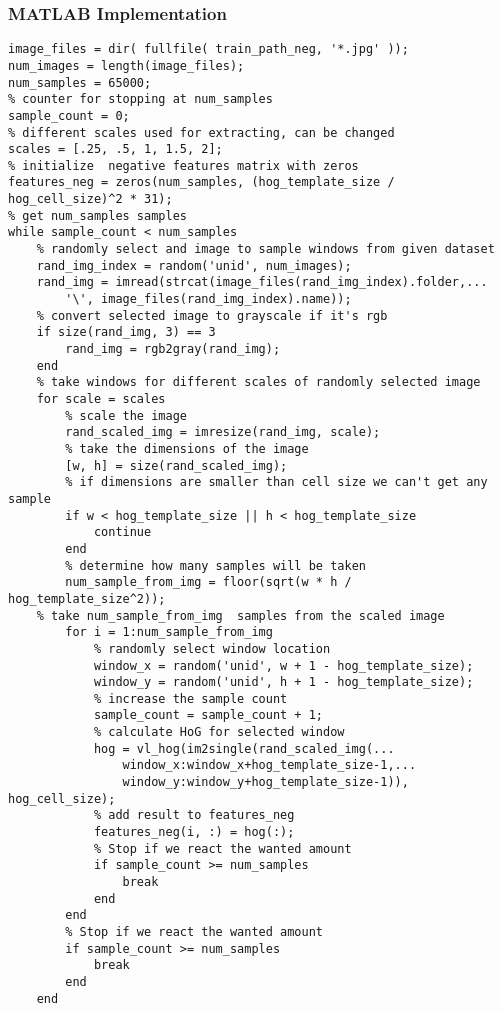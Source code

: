\documentclass{article}
\begin{document}
\subsubsection{MATLAB Implementation}
\begin{lstlisting}[caption={Related part of the get\_training\_features function for getting HoG values of non-face images.},captionpos=b]
image_files = dir( fullfile( train_path_neg, '*.jpg' ));
num_images = length(image_files);
num_samples = 65000;
% counter for stopping at num_samples
sample_count = 0;
% different scales used for extracting, can be changed
scales = [.25, .5, 1, 1.5, 2];
% initialize  negative features matrix with zeros
features_neg = zeros(num_samples, (hog_template_size / hog_cell_size)^2 * 31);
% get num_samples samples    
while sample_count < num_samples
    % randomly select and image to sample windows from given dataset
    rand_img_index = random('unid', num_images);
    rand_img = imread(strcat(image_files(rand_img_index).folder,...
        '\', image_files(rand_img_index).name));
    % convert selected image to grayscale if it's rgb
    if size(rand_img, 3) == 3
        rand_img = rgb2gray(rand_img);
    end
    % take windows for different scales of randomly selected image
    for scale = scales
        % scale the image
        rand_scaled_img = imresize(rand_img, scale);
        % take the dimensions of the image
        [w, h] = size(rand_scaled_img);    
        % if dimensions are smaller than cell size we can't get any sample 
        if w < hog_template_size || h < hog_template_size
            continue
        end
        % determine how many samples will be taken
        num_sample_from_img = floor(sqrt(w * h / hog_template_size^2));
	% take num_sample_from_img  samples from the scaled image
        for i = 1:num_sample_from_img
            % randomly select window location 
            window_x = random('unid', w + 1 - hog_template_size);
            window_y = random('unid', h + 1 - hog_template_size);
            % increase the sample count
            sample_count = sample_count + 1;
            % calculate HoG for selected window
            hog = vl_hog(im2single(rand_scaled_img(...
                window_x:window_x+hog_template_size-1,...
                window_y:window_y+hog_template_size-1)), hog_cell_size);
            % add result to features_neg
            features_neg(i, :) = hog(:);
            % Stop if we react the wanted amount
            if sample_count >= num_samples
                break
            end
        end
        % Stop if we react the wanted amount
        if sample_count >= num_samples
            break
        end
    end
\end{lstlisting}
\end{document}
